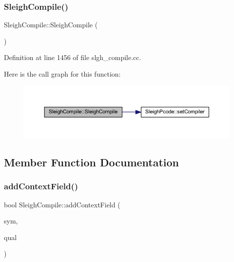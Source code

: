 \subsubsection{\texorpdfstring{SleighCompile()}{SleighCompile()}}
{\footnotesize\ttfamily Sleigh\+Compile\+::\+Sleigh\+Compile (\begin{DoxyParamCaption}\item[{void}]{ }\end{DoxyParamCaption})}



Definition at line 1456 of file slgh\+\_\+compile.\+cc.

Here is the call graph for this function\+:
\nopagebreak
\begin{figure}[H]
\begin{center}
\leavevmode
\includegraphics[width=350pt]{class_sleigh_compile_a7a400fe5185fa571983e19708668d70f_cgraph}
\end{center}
\end{figure}


\subsection{Member Function Documentation}
\mbox{\label{class_sleigh_compile_aa78e3d963607a1caea759cff7127123b}} 
\subsubsection{\texorpdfstring{addContextField()}{addContextField()}}
{\footnotesize\ttfamily bool Sleigh\+Compile\+::add\+Context\+Field (\begin{DoxyParamCaption}\item[{\mbox{\hyperlink{class_varnode_symbol}{Varnode\+Symbol}} $\ast$}]{sym,  }\item[{\mbox{\hyperlink{struct_field_quality}{Field\+Quality}} $\ast$}]{qual }\end{DoxyParamCaption})}



